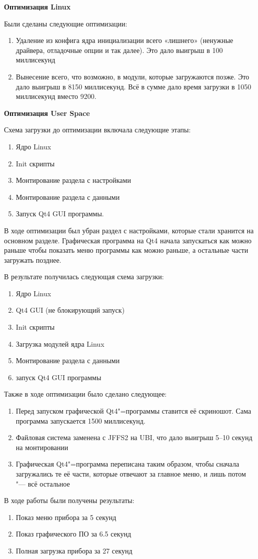 \documentclass[10pt, a5paper]{article}
\begin{document}
\textbf{Оптимизация Linux}

Были сделаны следующие оптимизации:

\begin{enumerate}
  \item Удаление из конфига ядра инициализации всего «лишнего» (ненужные драйвера, отладочные опции и так далее). Это дало выигрыш в 100 миллисекунд
  \item Вынесение всего, что возможно, в модули, которые загружаются позже. Это дало выигрыш в 8150 миллисекунд.
Всё в сумме дало время загрузки в 1050 миллисекунд вместо 9200.
\end{enumerate}

\textbf{Оптимизация User Space}

Схема загрузки до оптимизации включала следующие этапы:

\begin{enumerate}
  \item Ядро Linux
  \item Init скрипты
  \item Монтирование раздела с настройками
  \item Монтирование раздела с данными
  \item Запуск Qt4 GUI программы.
\end{enumerate}

В ходе оптимизации был убран раздел с настройками, которые стали хранится на основном разделе. Графическая программа на Qt4 начала запускаться как можно раньше чтобы показать меню программы как можно раньше, а остальные части загружать позднее.

В результате получилась следующая схема загрузки:

\begin{enumerate}
  \item Ядро Linux
  \item Qt4 GUI (не блокирующий запуск)
  \item Init скрипты
  \item Загрузка модулей ядра Linux
  \item Монтирование раздела с данными
  \item запуск Qt4 GUI программы
\end{enumerate}

Также в ходе оптимизации было сделано следующее:

\begin{enumerate}
  \item Перед запуском графической Qt4"=программы ставится её скриношот. Сама программа запускается 1500 миллисекунд.
  \item Файловая система заменена с JFFS2 на UBI, что дало выигрыш 5--10 секунд на монтировании
  \item Графическая Qt4"=программа переписана таким образом, чтобы сначала загружались те её части, которые отвечают за главное меню, и лишь потом "--- всё остальное
\end{enumerate}

В ходе работы были получены результаты:

\begin{enumerate}
  \item Показ меню прибора за 5 секунд
  \item Показ графического ПО за 6.5 секунд
  \item Полная загрузка прибора за 27 секунд
\end{enumerate}
\end{document}
